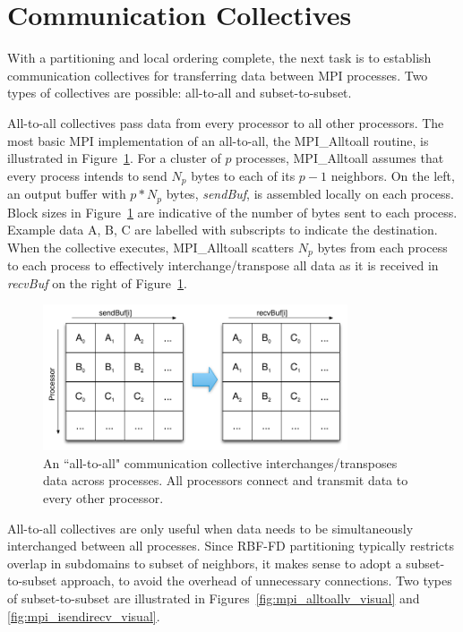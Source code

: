 \documentclass{report}
\begin{document}

\section{Communication Collectives}
\label{sec:mpi_collectives}

With a partitioning and local ordering complete, the next task is to establish communication collectives for transferring data between MPI processes. Two types of collectives are possible: all-to-all and subset-to-subset. 

All-to-all collectives pass data from every processor to all other processors. The most basic MPI implementation of an all-to-all, the MPI\_Alltoall routine, is illustrated in Figure~\ref{fig:mpi_alltoall_visual}. For a cluster of $p$ processes, MPI\_Alltoall assumes that every process intends to send $N_p$ bytes to each of its $p-1$ neighbors. On the left, an output buffer with $p*N_p$ bytes, \emph{sendBuf}, is assembled locally on each process. Block sizes in Figure~\ref{fig:mpi_alltoall_visual} are indicative of the number of bytes sent to each process. Example data A, B, C are labelled with subscripts to indicate the destination.  When the collective executes, MPI\_Alltoall scatters $N_p$ bytes from each process to each process to effectively interchange/transpose all data as it is received in \emph{recvBuf} on the right of Figure~\ref{fig:mpi_alltoall_visual}. 

\begin{figure}
\begin{center}
\includegraphics[width=9cm]{../figures/omnigraffle/MPI_Alltoall_Visual.png}
\caption{An ``all-to-all" communication collective interchanges/transposes data across processes. All processors connect and transmit data to every other processor.}
\label{fig:mpi_alltoall_visual}
\end{center}
\end{figure}

All-to-all collectives are only useful when data needs to be simultaneously interchanged between all processes. Since RBF-FD partitioning typically restricts overlap in subdomains to subset of neighbors, it makes sense to adopt a subset-to-subset approach, to avoid the overhead of unnecessary connections. 
Two types of subset-to-subset are illustrated in Figures~\ref{fig:mpi_alltoallv_visual} and \ref{fig:mpi_isendirecv_visual}. 
\end{document}
